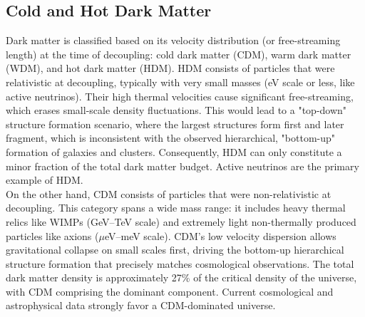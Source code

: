 \subsection{Cold and Hot Dark Matter}
\begin{intuition}
    Dark matter is classified based on its velocity distribution (or free-streaming length) at the time of decoupling: cold dark matter (CDM), warm dark matter (WDM), and hot dark matter (HDM). HDM consists of particles that were relativistic at decoupling, typically with very small masses (eV scale or less, like active neutrinos). Their high thermal velocities cause significant free-streaming, which erases small-scale density fluctuations. This would lead to a "top-down" structure formation scenario, where the largest structures form first and later fragment, which is inconsistent with the observed hierarchical, "bottom-up" formation of galaxies and clusters. Consequently, HDM can only constitute a minor fraction of the total dark matter budget. Active neutrinos are the primary example of HDM. \\

    On the other hand, CDM consists of particles that were non-relativistic at decoupling. This category spans a wide mass range: it includes heavy thermal relics like WIMPs (GeV–TeV scale) and extremely light non-thermally produced particles like axions ($\mu$eV–meV scale). CDM's low velocity dispersion allows gravitational collapse on small scales first, driving the bottom-up hierarchical structure formation that precisely matches cosmological observations. The total dark matter density is approximately 27\% of the critical density of the universe, with CDM comprising the dominant component. Current cosmological and astrophysical data strongly favor a CDM-dominated universe.
\end{intuition}

\clearpage
